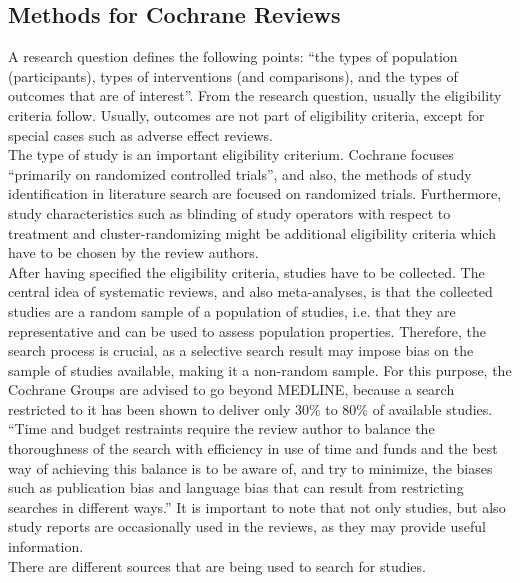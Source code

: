 \documentclass[11pt,a4paper,twoside]{book}\usepackage[]{graphicx}\usepackage[]{color}
\begin{document}
\subsection{Methods for Cochrane Reviews}
A research question defines the following points: ``the types of population (participants), types of interventions (and comparisons), and the types of outcomes that are of interest''. From the research question, usually the eligibility criteria follow. Usually, outcomes are not part of eligibility criteria, except for special cases such as adverse effect reviews. \\
The type of study is an important eligibility criterium. Cochrane focuses ``primarily on randomized controlled trials'', and also, the methods of study identification in literature search are focused on randomized trials. Furthermore, study characteristics such as blinding of study operators with respect to treatment and cluster-randomizing might be additional eligibility criteria which have to be chosen by the review authors. \\
After having specified the eligibility criteria, studies have to be collected. The central idea of systematic reviews, and also meta-analyses, is that the collected studies are a random sample of a population of studies, i.e. that they are representative and can be used to assess population properties. Therefore, the search process is crucial, as a selective search result may impose bias on the sample of studies available, making it a non-random sample. For this purpose, the Cochrane Groups are advised to go beyond MEDLINE, because a search restricted to it has been shown to deliver only 30\% to 80\% of available studies. ``Time and budget restraints require the review author to balance the thoroughness of the search with efficiency in use of time and funds and the best way of achieving this balance is to be aware of, and try to minimize, the biases such as publication bias and language bias that can result from restricting searches in different ways.'' It is important to note that not only studies, but also study reports are occasionally used in the reviews, as they may provide useful information. \\
There are different sources that are being used to search for studies.
\end{document}
